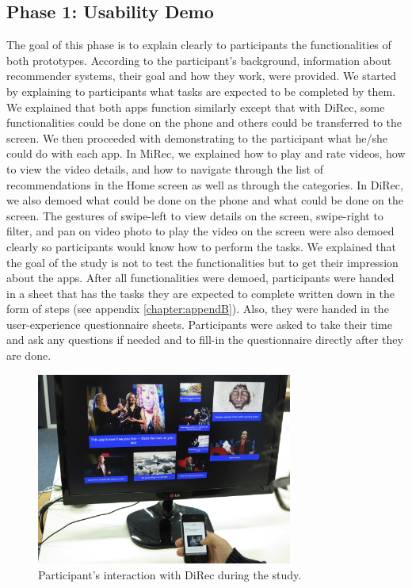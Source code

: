 \subsection{Phase 1: Usability Demo}
The goal of this phase is to explain clearly to participants the functionalities
of both prototypes. According to the participant’s background, information about
recommender systems, their goal and how they work, were provided. We started by
explaining to participants what tasks are expected to be completed by them.
We explained that both apps function similarly except that with DiRec, some
functionalities could be done on the phone and others could be transferred to
the screen. We then proceeded with demonstrating to the participant what he/she
could do with each app. In MiRec, we explained how to play and rate videos, how
to view the video details, and how to navigate through the list of
recommendations in the Home screen as well as through the categories. In DiRec,
we also demoed what could be done on the phone and what could be done on the
screen. The gestures of swipe-left to view details on the screen, swipe-right to
filter, and pan on video photo to play the video on the screen were also demoed
clearly so participants would know how to perform the tasks. We explained that the goal of
the study is not to test the functionalities but to get their impression about
the apps. After all functionalities were demoed, participants were handed in a
sheet that has the tasks they are expected to complete written down in the form
of steps (see appendix \ref{chapter:appendB}). Also, they were handed in the
user-experience questionnaire sheets. Participants were asked to take their time and ask any questions if needed and to fill-in the questionnaire
directly after they are done.
\begin{figure}[t]
\includegraphics[width=0.75\textwidth, center, center]{figures/IMG_6806}
\caption{Participant's interaction with DiRec during the study.}
\label{fig:figure51}
\end{figure}
